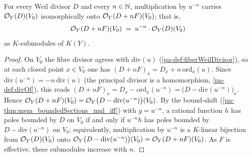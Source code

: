 \begin{theorem}
  \label{pa-thm:divisorSections_twist_chart0}
  \leanok

  For every Weil divisor \(D\) and every \(n \in \mathbb{N}\), multiplication by \(u^{-n}\) carries
  \(\mathcal{O}_{Y}(D)(V_0)\) isomorphically onto \(\mathcal{O}_{Y}(D + nF)(V_0)\); that is,
  \[
    \mathcal{O}_{Y}(D + nF)(V_0) \;=\; u^{-n}\cdot \mathcal{O}_{Y}(D)(V_0)
  \]
  as \(K\)-submodules of \(K(Y)\).
\end{theorem}
\begin{proof}
  \leanok
  On \(V_0\) the fibre divisor agrees with \(\mathrm{div}(u)\) (\ref{pa-def:fiberWeilDivisor}), so at
  each closed point \(x \in V_0\) one has \((D + nF)_x = D_x + n\,\mathrm{ord}_x(u)\). Since
  \(\mathrm{div}(u^{-n}) = -n\,\mathrm{div}(u)\) (the principal divisor is a homomorphism,
  \ref{pa-def:divOf}), this reads \((D + nF)_x = D_x - \mathrm{ord}_x(u^{-n}) = \bigl(D -
  \mathrm{div}(u^{-n})\bigr)_x\). Hence \(\mathcal{O}_{Y}(D + nF)(V_0) = \mathcal{O}_{Y}\bigl(D -
  \mathrm{div}(u^{-n})\bigr)(V_0)\). By the bound-shift (\ref{pa-thm:mem_boundedSections_mul_iff}) with
  \(g = u^{-n}\), a rational function \(h\) has poles bounded by \(D\) on \(V_0\) if and only if
  \(u^{-n} h\) has poles bounded by \(D - \mathrm{div}(u^{-n})\) on \(V_0\); equivalently,
  multiplication by \(u^{-n}\) is a \(K\)-linear bijection from \(\mathcal{O}_{Y}(D)(V_0)\) onto
  \(\mathcal{O}_{Y}\bigl(D - \mathrm{div}(u^{-n})\bigr)(V_0) = \mathcal{O}_{Y}(D + nF)(V_0)\). As \(F\) is
  effective, these submodules increase with \(n\).
\end{proof}

